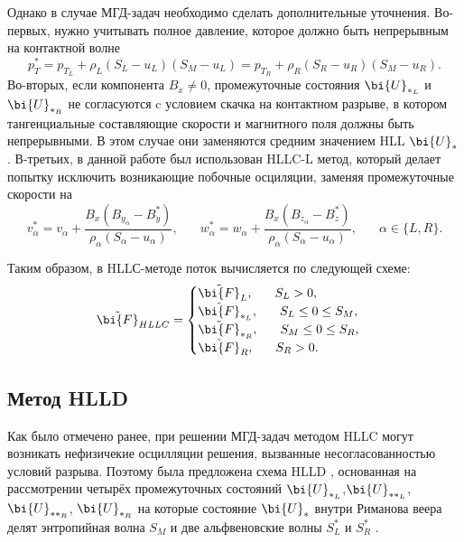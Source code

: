 \documentclass[12pt, a4paper]{article}
\begin{document}
 	Однако в случае МГД-задач необходимо сделать дополнительные уточнения. Во-первых, нужно учитывать полное давление, которое должно быть непрерывным на контактной волне
 	\[
 	p_T^* = p_{T_L} + \rho_L(S_L-u_L)(S_M-u_L) = p_{T_R} + \rho_R(S_R-u_R)(S_M-u_R).
 	\]
 	Во-вторых, если компонента $B_x \not= 0$, промежуточные состояния $\bi{U}_{*_L}$ и $\bi{U}_{*_R}$ не согласуются c условием скачка на контактном разрыве, в котором тангенциальные составляющие скорости и магнитного поля должны быть непрерывными. В этом случае они заменяются средним значением HLL $\bi{U}_*$.
 	В-третьих, в данной работе был использован HLLC-L метод, который делает попытку исключить возникающие побочные осциляции, заменяя промежуточные скорости на
 	\[
 	v^*_{\alpha} = v_\alpha + \dfrac{B_x(B_{y_\alpha}-B_y^*)}{\rho_\alpha(S_\alpha-u_\alpha)}, \phantom{xxx}
 	w^*_{\alpha} = w_\alpha + \dfrac{B_x(B_{z_\alpha}-B_z^*)}{\rho_\alpha(S_\alpha-u_\alpha)}, \phantom{xxx}\alpha\in\{L,R\}.
 	\]
 	
 	Таким образом, в HLLС-методе поток вычисляется по следующей схеме:
 	\[
 	\tilde{\bi{F}}_{HLLC} = 
 	\begin{cases}
 		\tilde{\bi{F}}_{L}, \phantom{xxx} S_L > 0, \\
 		\tilde{\bi{F}}_{*_L}, \phantom{xxx} S_L \le 0 \le S_M, \\
 		\tilde{\bi{F}}_{*_R}, \phantom{xxx} S_M \le 0 \le S_R, \\
 		\tilde{\bi{F}}_{R}, \phantom{xxx} S_R > 0.
 	\end{cases}
 	\]
 	\subsection{Метод HLLD}
 	
 	Как было отмечено ранее, при решении МГД-задач методом HLLC могут возникать нефизичекие осцилляции решения, вызванные несогласованностью условий разрыва. Поэтому была предложена схема HLLD , основанная на рассмотрении четырёх промежуточных состояний $\bi{U}_{*_L}$,$\bi{U}_{**_L}$,$\bi{U}_{**_R}$, $\bi{U}_{*_R}$ на которые состояние $\bi{U}_*$ внутри Риманова веера делят энтропийная волна $S_M$ и две альфвеновские волны $S_L^*$ и $S_R^*$ \cite{Kusano}.
 	
\end{document}
